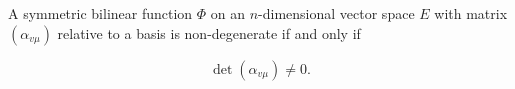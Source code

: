 A symmetric bilinear function $\Phi$ on an $n$-dimensional vector space $E$ with matrix $(\alpha_{v\mu})$ relative to a basis is non-degenerate if and only if

$$\det(\alpha_{v\mu}) \neq 0.$$
